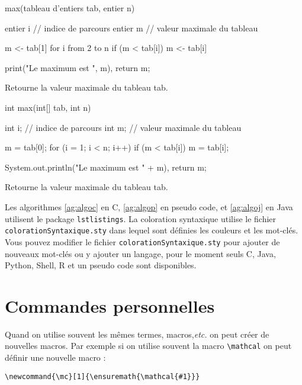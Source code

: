\documentclass{rapport}
\def\etc{\textit{etc.}\xspace}
\begin{document}
      \begin{algorithm}
        \begin{PseudoCode}
max(tableau d'entiers tab, entier n) {
  entier i // indice de parcours
  entier m // valeur maximale du tableau
  
  m <- tab[1]
  for i from 2 to n {
    if (m < tab[i]) {
      m <- tab[i]
    }
  }
  
  print("Le maximum est ", m),
  return m;
}
        \end{PseudoCode}
        \caption[Algo en PseudoCode]{Retourne la valeur maximale du tableau tab.\label{ag:algop}}
      \end{algorithm}
      
      \begin{algorithm}
        \begin{Java}
int max(int[] tab, int n) {
  int i; // indice de parcours
  int m; // valeur maximale du tableau
  
  m = tab[0];
  for (i = 1; i < n; i++) {
    if (m < tab[i]) {
      m = tab[i];
    }
  }
  
  System.out.println("Le maximum est " + m),
  return m;
}
        \end{Java}
        \caption[Algo en Java]{Retourne la valeur maximale du tableau tab.\label{ag:algoj}}
      \end{algorithm}
      
      Les algorithmes \ref{ag:algoc} en C, \ref{ag:algop} en pseudo code, et \ref{ag:algoj} en Java utilisent le package \verb|lstlistings|. La coloration syntaxique utilise le fichier \verb|colorationSyntaxique.sty| dans lequel sont définies les couleurs et les mot-clés. Vous pouvez modifier le fichier \verb|colorationSyntaxique.sty| pour ajouter de nouveaux mot-clés ou y ajouter un langage, pour le moment seuls C, Java, Python, Shell, R et un pseudo code sont disponibles.
      
    \section{Commandes personnelles}
      
      Quand on utilise souvent les mêmes termes, macros,\etc on peut créer de nouvelles macros. Par exemple si on utilise souvent la macro \verb|\mathcal| on peut définir une nouvelle macro :
      \begin{verbatim}
\newcommand{\mc}[1]{\ensuremath{\mathcal{#1}}}\end{verbatim}
        
\end{document}
